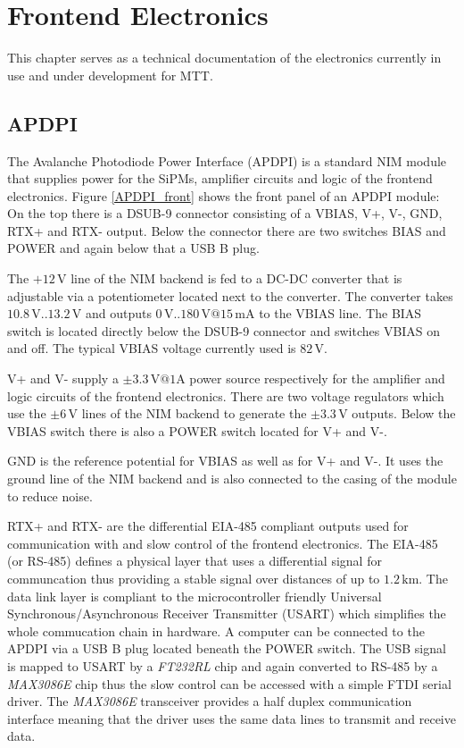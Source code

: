 \section{Frontend Electronics}

This chapter serves as a technical documentation of the electronics currently in use and under development for MTT.

\subsection{APDPI}

The Avalanche Photodiode Power Interface (APDPI) is a standard NIM module that supplies power for the SiPMs, amplifier circuits and logic of the frontend electronics.
Figure \ref{APDPI_front} shows the front panel of an APDPI module: On the top there is a DSUB-9 connector consisting of a VBIAS, V+, V-, GND, RTX+ and RTX- output.
Below the connector there are two switches BIAS and POWER and again below that a USB B plug.

The $+12\,\text{V}$ line of the NIM backend is fed to a DC-DC converter that is adjustable via a potentiometer located next to the converter.
The converter takes $10.8\,\text{V} .. 13.2\,\text{V}$ and outputs $0\,\text{V} .. 180\,\text{V}@15\,\text{mA}$ to the VBIAS line. The BIAS switch is located directly below the
DSUB-9 connector and switches VBIAS on and off. The typical VBIAS voltage currently used is $82\,\text{V}$.

V+ and V- supply a $\pm3.3\,\text{V}@1\text{A}$ power source respectively for the amplifier and logic circuits of the frontend electronics. There are two voltage regulators 
which use the $\pm6\,\text{V}$ lines of the NIM backend to generate the $\pm3.3\,\text{V}$ outputs. Below the VBIAS switch there is also a POWER switch located for V+ and V-.

GND is the reference potential for VBIAS as well as for V+ and V-. It uses the ground line of the NIM backend and is also connected to the casing of the 
module to reduce noise.

RTX+ and RTX- are the differential EIA-485 compliant outputs used for communication with and slow control of the frontend electronics. The EIA-485 (or RS-485) 
defines a physical layer that uses a differential signal for communcation thus providing a stable signal over distances of up to $1.2\,\text{km}$. The data link layer is 
compliant to the microcontroller friendly Universal Synchronous/Asynchronous Receiver Transmitter (USART) which simplifies the whole commucation chain in hardware. 
A computer can be connected to the APDPI via a USB B plug located beneath the POWER switch. The USB signal is mapped to USART by a \emph{FT232RL} 
chip and again converted to RS-485 by a \emph{MAX3086E} chip thus the slow control can be accessed with a simple 
FTDI serial driver.
The \emph{MAX3086E} transceiver provides a half duplex communication interface meaning that the driver uses the same data lines to transmit and receive data.

